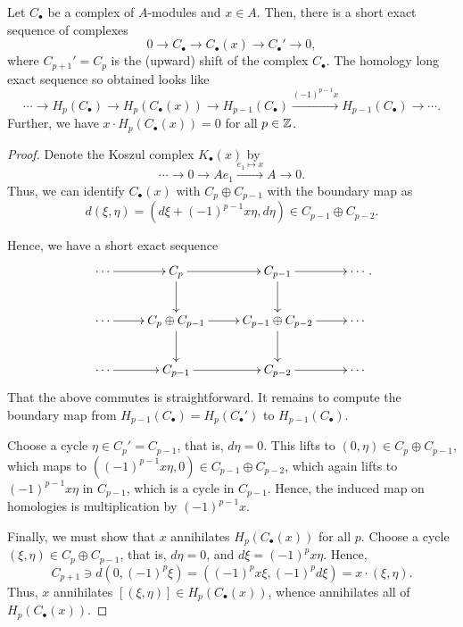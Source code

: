 \begin{theorem}
    Let $C_\bullet$ be a complex of $A$-modules and $x\in A$. Then, there is a short exact sequence of complexes 
    \begin{equation*}
        0\to C_\bullet\to C_\bullet(x)\to C_\bullet'\to 0,
    \end{equation*}
    where $C_{p + 1}' = C_p$ is the (upward) shift of the complex $C_\bullet$. The homology long exact sequence so obtained looks like 
    \begin{equation*}
        \cdots\to H_p(C_\bullet)\to H_p(C_\bullet(x))\to H_{p - 1}(C_\bullet)\xrightarrow{(-1)^{p - 1}x} H_{p - 1}(C_\bullet)\to\cdots.
    \end{equation*}
    Further, we have $x\cdot H_p(C_\bullet(x)) = 0$ for all $p\in\mathbb{Z}$.
\end{theorem}
\begin{proof}
    Denote the Koszul complex $K_\bullet(x)$ by 
    \begin{equation*}
        \cdots\to 0\to Ae_1\xrightarrow{e_1\mapsto x} A\to 0.
    \end{equation*}
    Thus, we can identify $C_\bullet(x)$ with $C_p\oplus C_{p - 1}$ with the boundary map as 
    \begin{equation*}
        d(\xi, \eta) = (d\xi + (-1)^{p - 1}x\eta, d\eta)\in C_{p - 1}\oplus C_{p - 2}.
    \end{equation*}

    Hence, we have a short exact sequence 
    \begin{equation*}
        \xymatrix {
            \cdots\ar[r] & C_p\ar[r]\ar[d] & C_{p - 1}\ar[d]\ar[r] & \cdots\\
            \cdots\ar[r] & C_p\oplus C_{p - 1}\ar[d]\ar[r] & C_{p - 1}\oplus C_{p - 2}\ar[d]\ar[r] & \cdots\\
            \cdots\ar[r] & C_{p - 1}\ar[r] & C_{p - 2}\ar[r] & \cdots
        }.
    \end{equation*}
    That the above commutes is straightforward. It remains to compute the boundary map from $H_{p - 1}(C_\bullet) = H_p(C_\bullet')$ to $H_{p - 1}(C_\bullet)$.

    Choose a cycle $\eta\in C_p' = C_{p - 1}$, that is, $d\eta = 0$. This lifts to $(0,\eta)\in C_p\oplus C_{p - 1}$, which maps to $\left((-1)^{p - 1}x\eta, 0\right)\in C_{p - 1}\oplus C_{p - 2}$, which again lifts to $(-1)^{p - 1}x\eta$ in $C_{p - 1}$, which is a cycle in $C_{p - 1}$. Hence, the induced map on homologies is multiplication by $(-1)^{p - 1}x$.

    Finally, we must show that $x$ annihilates $H_p(C_\bullet(x))$ for all $p$. Choose a cycle $(\xi,\eta)\in C_p\oplus C_{p - 1}$, that is, $d\eta = 0$, and $d\xi = (-1)^p x\eta$. Hence, 
    \begin{equation*}
        C_{p + 1}\ni d(0, (-1)^p\xi) = \left((-1)^px\xi, (-1)^p d\xi\right) = x\cdot(\xi, \eta).
    \end{equation*}
    Thus, $x$ annihilates $[(\xi,\eta)]\in H_p(C_\bullet(x))$, whence annihilates all of $H_p(C_\bullet(x))$.
\end{proof}

